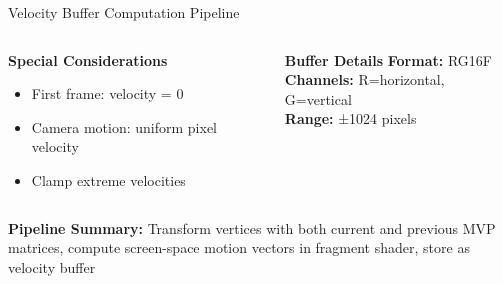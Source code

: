 \documentclass[aspectratio=169]{beamer}
\begin{document}
\begin{frame}[shrink=5]{Velocity Buffer Computation Pipeline}
\begin{columns}[t]
        \begin{column}{0.33\textwidth}
            \begin{block}{\textbf{Special Considerations}}
                {\scriptsize
                \begin{itemize}
                    \item First frame: velocity = 0
                    \item Camera motion: uniform pixel velocity
                    \item Clamp extreme velocities
                \end{itemize}
                }
            \end{block}
        \end{column}
        
        \begin{column}{0.33\textwidth}
            \begin{block}{\textbf{Buffer Details}}
                {\scriptsize
                \textbf{Format:} RG16F\\[0.1cm]
                \textbf{Channels:} R=horizontal, G=vertical\\[0.1cm]
                \textbf{Range:} ±1024 pixels
                }
            \end{block}
        \end{column}
    \end{columns}
    
    \vspace{0.1cm}
    
    \begin{center}
        \colorbox{yellow!20}{\parbox{9cm}{\centering\small
            \textbf{Pipeline Summary:} Transform vertices with both current and previous MVP matrices, compute screen-space motion vectors in fragment shader, store as velocity buffer
        }}
    \end{center}
    
\end{frame}
\end{document}
